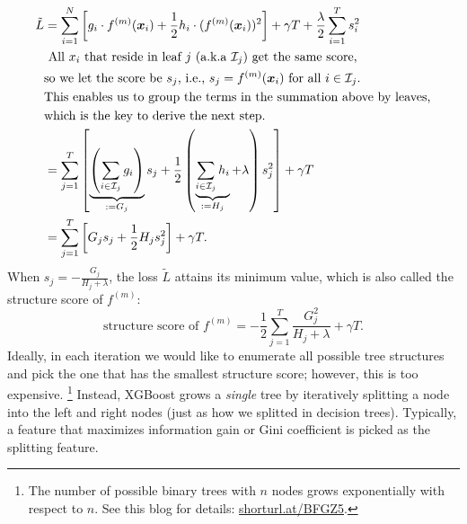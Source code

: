             \begin{equation}
                \begin{aligned}
                    \tilde{L} & = \sum_{i=1}^{N}{
                        \left[
                            g_i \cdot f^{(m)}(\bm{x}_i) + \frac{1}{2} h_i \cdot (f^{(m)}(\bm{x}_i))^2 
                        \right] + \gamma T + \frac{\lambda}{2}\sum_{i=1}^{T}{s_i^2}
                    } \\
                    & \text{
                    All $x_i$ that reside in leaf $j$ (a.k.a  $\mathcal{I}_j$) get the same score,} \\
                    & \text{so we let the score be $s_j$, i.e., $s_j = f^{(m)}(\bm{x}_i)$ for all $i \in \mathcal{I}_j$.} \\
                    & \text{This enables us to group the terms in the summation above by leaves,} \\
                    & \text{which is the key to derive the next step.} \\
                    & = \sum_{j=1}^{T}{
                        \left[ \underbrace{\left(\sum_{i \in \mathcal{I}_j}^{}{g_i} \right)}_{:=G_j} s_j + \frac{1}{2}\left( \underbrace{\sum_{i \in \mathcal{I}_j}^{}{h_i}}_{:=H_j} + \lambda \right)s_j^2
                        \right] + \gamma T 
                    } \\
                    & = \sum_{j=1}^{T}{ \left[ G_j s_j + \frac{1}{2} H_j s_j^2 \right] } + \gamma T.
                \end{aligned}
            \end{equation}
        When $s_j = -\frac{G_j}{H_j + \lambda}$, the loss $\tilde{L}$ attains its minimum value, which is also called the structure score of $f^{(m)}$:
            \begin{equation}
                \text{structure score of $f^{(m)}$}= -\frac{1}{2}\sum_{j=1}^{T}{\frac{G_j^2}{H_j + \lambda}} + \gamma T.
            \end{equation}
        Ideally, in each iteration we would like to enumerate all possible tree structures and pick the one that has the smallest structure score; however, this is too expensive. \footnote{The number of possible binary trees with $n$ nodes grows exponentially with respect to $n$. See this blog for details: \url{shorturl.at/BFGZ5}.}
        Instead, XGBoost grows a \emph{single} tree by iteratively splitting a node into the left and right nodes (just as how we splitted in decision trees).
        Typically, a feature that maximizes information gain or Gini coefficient is picked as the splitting feature.
